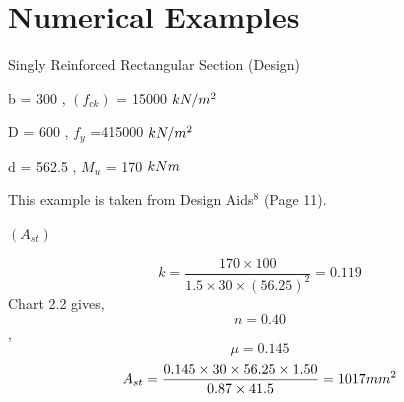 \section{Numerical Examples}
\begin{example}
 Singly Reinforced Rectangular Section (Design)

\given 
b = 300 \mm, $(f_{ck})$ = 15000 $kN/m^2$

 D = 600 \mm, $f_y$ =415000 $kN/m^2$

d = 562.5 \mm, $M_u$  = 170 $kNm$

This example is taken from Design Aids$^{8}$ (Page 11).

\required$(A_{st})$

\solution
$$k= \frac{170 \times 100}{1.5 \times 30 \times (56.25)^2} =0.119$$
Chart 2.2 gives,
$$n=0.40$$, 
$$\mu=0.145$$
$$A_{st}=\frac{0.145 \times 30 \times 56.25 \times 1.50}{0.87 \times 41.5} = 1017 mm^2$$
\end{example}

